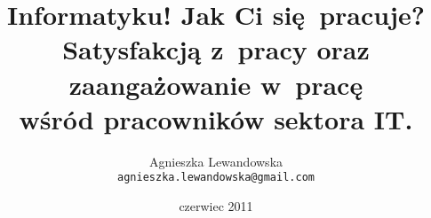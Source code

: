 \documentclass[a4paper,11pt,titlepage]{article}
\begin{document}
\title{Informatyku! Jak Ci się pracuje? \\ \Large Satysfakcją z~pracy oraz zaangażowanie w~pracę \\ wśród pracowników sektora IT.}
\author{\Large{Agnieszka Lewandowska} \\ \texttt{agnieszka.lewandowska@gmail.com} }
\date{czerwiec 2011}
\maketitle


\tableofcontents
\cleardoublepage







\graphicspath{{img/group/}}

\graphicspath{{img/results/}}



\cleardoublepage

\end{document}
